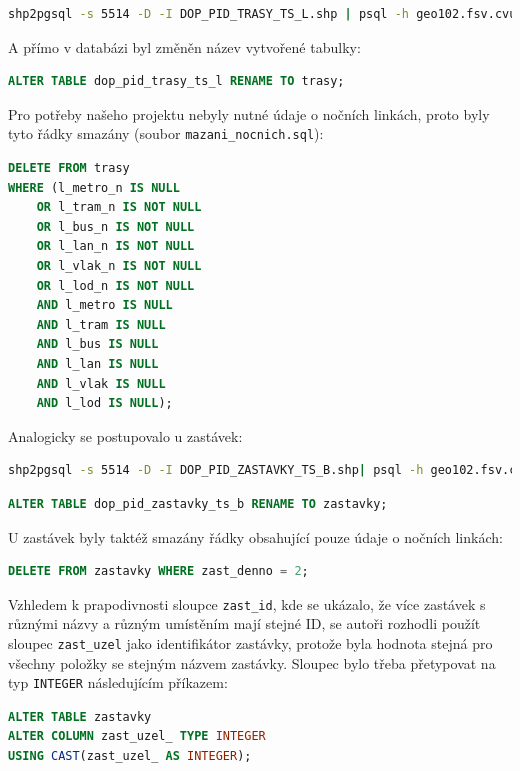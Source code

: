 \documentclass[a4paper, 12pt]{article}
\begin{document}
\begin{lstlisting}[language=bash]
shp2pgsql -s 5514 -D -I DOP_PID_TRASY_TS_L.shp | psql -h geo102.fsv.cvut.cz -d pgis_uzpd -U uzpd18_a
\end{lstlisting} 
 
A přímo v databázi byl změněn název vytvořené tabulky:

\begin{lstlisting}[language=sql]
ALTER TABLE dop_pid_trasy_ts_l RENAME TO trasy;
\end{lstlisting} 

Pro potřeby našeho projektu nebyly nutné údaje o nočních linkách, proto byly tyto řádky smazány (soubor \texttt{mazani\_nocnich.sql}): 
\begin{lstlisting}[language=sql]
DELETE FROM trasy 
WHERE (l_metro_n IS NULL
	OR l_tram_n IS NOT NULL
	OR l_bus_n IS NOT NULL
	OR l_lan_n IS NOT NULL
	OR l_vlak_n IS NOT NULL
	OR l_lod_n IS NOT NULL
	AND l_metro IS NULL
	AND l_tram IS NULL
	AND l_bus IS NULL
	AND l_lan IS NULL 
	AND l_vlak IS NULL 
	AND l_lod IS NULL);
\end{lstlisting} 

Analogicky se postupovalo u zastávek:

\begin{lstlisting}[language=bash]
shp2pgsql -s 5514 -D -I DOP_PID_ZASTAVKY_TS_B.shp| psql -h geo102.fsv.cvut.cz -d pgis_uzpd -U uzpd18_a
\end{lstlisting} 

\begin{lstlisting}[language=sql]
ALTER TABLE dop_pid_zastavky_ts_b RENAME TO zastavky;
\end{lstlisting} 

U zastávek byly taktéž smazány řádky obsahující pouze údaje o nočních linkách:
\begin{lstlisting}[language=sql]
DELETE FROM zastavky WHERE zast_denno = 2;
\end{lstlisting} 

Vzhledem k prapodivnosti sloupce \texttt{zast\_id}, kde se ukázalo, že více zastávek s různými názvy a různým umístěním mají stejné ID, se autoři rozhodli použít sloupec \texttt{zast\_uzel} jako identifikátor zastávky, protože byla hodnota stejná pro všechny položky se stejným názvem zastávky. Sloupec bylo třeba přetypovat na typ \texttt{INTEGER} následujícím příkazem: 

\begin{lstlisting}[language=sql]
ALTER TABLE zastavky 
ALTER COLUMN zast_uzel_ TYPE INTEGER 
USING CAST(zast_uzel_ AS INTEGER);
\end{lstlisting} 
\end{document}
